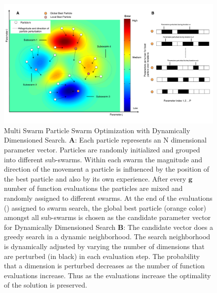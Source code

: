 \documentclass[12pt]{article}
\begin{document}
\begin{figure}[H]
\centering
\includegraphics[width=1.0\textwidth,height=0.5\textheight]{./figs/Figure_1_Algorithm.pdf}
\caption{Multi Swarm Particle Swarm Optimization with Dynamically Dimensioned Search. \textbf{A}: Each particle represents an N dimensional parameter vector. Particles are randomly initialized and grouped into different sub-swarms. Within each swarm the magnitude and direction of the movement a particle is influenced by the position of the best particle and also by its own experience. After every $\mathbf{g}$ number of function evaluations the particles are mixed and randomly assigned to different swarms. At the end of the evaluations () assigned to swarm search, the global best particle (orange color) amongst all sub-swarms is chosen as the candidate parameter vector for Dynamically Dimensioned Search \textbf{B}: The candidate vector does a greedy search in a dynamic neighborhood. The search neighborhood is dynamically adjusted by varying the number of dimensions that are perturbed (in black) in each evaluation step. The probability that a dimension is perturbed decreases as the number of function evaluations increase. Thus as the evaluations increase the optimality of the solution is preserved. 
}\label{fig-algorithm}
\end{figure}
\end{document}
